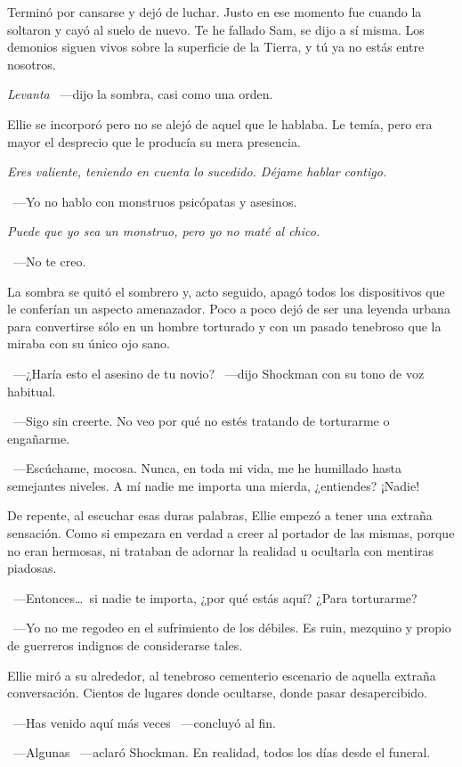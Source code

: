 Terminó por cansarse y dejó de luchar. Justo en ese momento fue cuando la soltaron y cayó al suelo de nuevo. Te he fallado Sam, se dijo a sí misma. Los demonios siguen vivos sobre la superficie de la Tierra, y tú ya no estás entre nosotros.

\emph{Levanta} ~---dijo la sombra, casi como una orden.

Ellie se incorporó pero no se alejó de aquel que le hablaba. Le temía, pero era mayor el desprecio que le producía su mera presencia.

\emph{Eres valiente, teniendo en cuenta lo sucedido. Déjame hablar contigo.}

~---Yo no hablo con monstruos psicópatas y asesinos.

\emph{Puede que yo sea un monstruo, pero yo no maté al chico.}

~---No te creo.

La sombra se quitó el sombrero y, acto seguido, apagó todos los dispositivos que le conferían un aspecto amenazador. Poco a poco dejó de ser una leyenda urbana para convertirse sólo en un hombre torturado y con un pasado tenebroso que la miraba con su único ojo sano.

~---¿Haría esto el asesino de tu novio? ~---dijo Shockman con su tono de voz habitual.

~---Sigo sin creerte. No veo por qué no estés tratando de torturarme o engañarme.

~---Escúchame, mocosa. Nunca, en toda mi vida, me he humillado hasta semejantes niveles. A mí nadie me importa una mierda, ¿entiendes? ¡Nadie!

De repente, al escuchar esas duras palabras, Ellie empezó a tener una extraña sensación. Como si empezara en verdad a creer al portador de las mismas, porque no eran hermosas, ni trataban de adornar la realidad u ocultarla con mentiras piadosas.

~---Entonces\dots\ si nadie te importa, ¿por qué estás aquí? ¿Para torturarme?

~---Yo no me regodeo en el sufrimiento de los débiles. Es ruin, mezquino y propio de guerreros indignos de considerarse tales.

Ellie miró a su alrededor, al tenebroso cementerio escenario de aquella extraña conversación. Cientos de lugares donde ocultarse, donde pasar desapercibido.

~---Has venido aquí más veces ~---concluyó al fin.

~---Algunas ~---aclaró Shockman. En realidad, todos los días desde el funeral.

